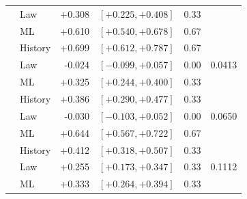 \documentclass[11pt]{article}
\begin{document}
\begin{table}[H]
\begin{tabular}{llrlrr}
 & Law & +0.308 & \([+0.225,+0.408]\) & 0.33 & \\
 & ML & +0.610 & \([+0.540,+0.678]\) & 0.67 & \\
\addlinespace
\multirow{3}{*}{\(2-0-1\)} & History & +0.699 & \([+0.612,+0.787]\) & 0.67 & \multirow{3}{*}{0.0413} \\
 & Law & -0.024 & \([-0.099,+0.057]\) & 0.00 & \\
 & ML & +0.325 & \([+0.244,+0.400]\) & 0.33 & \\
\addlinespace
\multirow{3}{*}{\(1-0-2\)} & History & +0.386 & \([+0.290,+0.477]\) & 0.33 & \multirow{3}{*}{0.0650} \\
 & Law & -0.030 & \([-0.103,+0.052]\) & 0.00 & \\
 & ML & +0.644 & \([+0.567,+0.722]\) & 0.67 & \\
\addlinespace
\multirow{3}{*}{\(1-1-1\)} & History & +0.412 & \([+0.318,+0.507]\) & 0.33 & \multirow{3}{*}{0.1112} \\
 & Law & +0.255 & \([+0.173,+0.347]\) & 0.33 & \\
 & ML & +0.333 & \([+0.264,+0.394]\) & 0.33 & \\
\bottomrule
\end{tabular}
\end{table}
\end{document}
